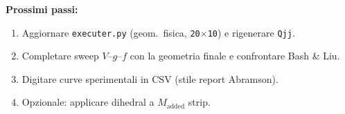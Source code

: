 \documentclass[11pt,a4paper]{article}
\begin{document}
\textbf{Prossimi passi:}
\begin{enumerate}
  \item Aggiornare \texttt{executer.py} (geom.\ fisica, \texttt{20$\times$10}) e rigenerare \texttt{Qjj}.
  \item Completare sweep $V$--$g$--$f$ con la geometria finale e confrontare Bash \& Liu.
  \item Digitare curve sperimentali in CSV (stile report Abramson).
  \item Opzionale: applicare dihedral a $M_\mathrm{added}$ strip.
\end{enumerate}
\end{document}
